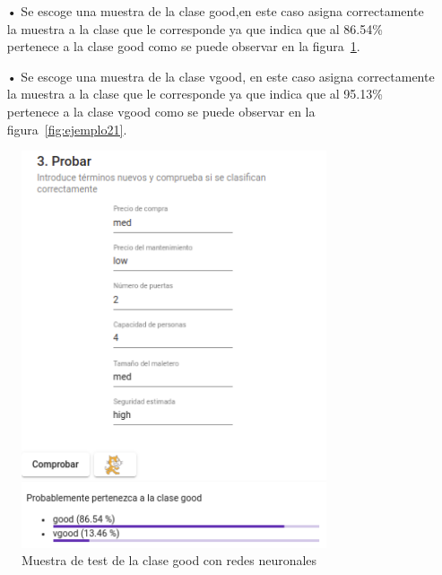 \documentclass[a4paper, 12pt]{book}
\begin{document}
\begin{itemize}
\item[•] Se escoge una muestra de la clase good,en este caso asigna correctamente la muestra a la clase que le corresponde ya que indica que al 86.54\% pertenece a la clase good como se puede observar en la figura~\ref{fig:ejemplo20}.
\item[•] Se escoge una muestra de la clase vgood, en este caso asigna correctamente la muestra a la clase que le corresponde ya que indica que al 95.13\% pertenece a la clase vgood como se puede observar en la figura~\ref{fig:ejemplo21}. 
\end{itemize}

\begin{figure}
	\centering
	\includegraphics[width=9cm, keepaspectratio]{img/good_rn.png}
	\caption{Muestra de test de la clase good con redes neuronales} 	\label{fig:ejemplo20}
\end{figure}
\end{document}
